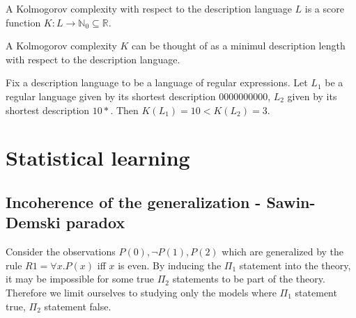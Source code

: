 \begin{exmp}
A Kolmogorov complexity with respect to the description language $L$ is a score function $K:L \to \mathbb{N}_0 \subseteq \mathbb{R}$.
\end{exmp}

\begin{note}
A Kolmogorov complexity $K$ can be thought of as a minimul description length with respect to the description language.
\end{note}
\begin{exmp}
Fix a description language to be a language of regular expressions. Let $L_1$ be a regular language given by its shortest description $0000000000$, $L_2$ given by its shortest description $10*$. Then $K(L_1)=10<K(L_2)=3$.
\end{exmp}

\chapter{Statistical learning}

\section{Incoherence of the generalization - Sawin-Demski paradox}
Consider the observations $P(0), \neg P(1), P(2)$ which are generalized by the rule $R1=\forall x. P(x)$ iff $x$ is even.
By inducing the $\Pi_1$ statement into the theory, it may be impossible for some true $\Pi_2$ statements to be part of the theory\cite{sawin2013}.
Therefore we limit ourselves to studying only the models where $\Pi_1$ statement true, $\Pi_2$ statement false.
